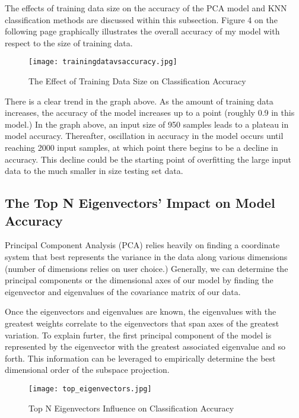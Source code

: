 \documentclass[12pt]{article}
\begin{document}
The effects of training data size on the accuracy of the PCA model and KNN classification methods are discussed within this subsection. Figure 4 on the following page graphically illustrates the overall accuracy of my model with respect to the size of training data. 

\begin{figure}[!htb]
    \centering
    \texttt{[image: trainingdatavsaccuracy.jpg]}
  \caption{The Effect of Training Data Size on Classification Accuracy}
\end{figure}
\FloatBarrier

\noindent
There is a clear trend in the graph above. As the amount of training data increases, the accuracy of the model increases up to a point (roughly 0.9 in this model.) In the graph above, an input size of 950 samples leads to a plateau in model accuracy. Thereafter, oscillation in accuracy in the model occurs until reaching 2000 input samples, at which point there begins to be a decline in accuracy. This decline could be the starting point of overfitting the large input data to the much smaller in size testing set data. 

\subsection{The Top N Eigenvectors’ Impact on Model Accuracy}

Principal Component Analysis (PCA) relies heavily on finding a coordinate system that best represents the variance in the data along various dimensions (number of dimensions relies on user choice.) Generally, we can determine the principal components or the dimensional axes of our model by finding the eigenvector and eigenvalues of the covariance matrix of our data. 

\bigbreak
\noindent
Once the eigenvectors and eigenvalues are known, the eigenvalues with the greatest weights correlate to the eigenvectors that span axes of the greatest variation. To explain furter, the first principal component of the model is represented by the eigenvector with the greatest associated eigenvalue and so forth. This information can be leveraged to empirically determine the best dimensional order of the subspace projection. 

\begin{figure}[!htb]
    \centering
    \texttt{[image: top\_eigenvectors.jpg]}
  \caption{Top N Eigenvectors Influence on Classification Accuracy}
\end{figure}
\FloatBarrier
\end{document}

